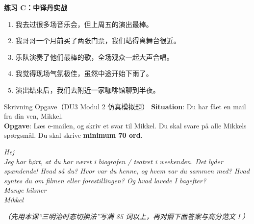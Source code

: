 \textbf{练习 C：中译丹实战}
\begin{enumerate}
  \item 我去过很多场音乐会，但上周五的演出最棒。
  \item 我哥哥一个月前买了两张门票，我们站得离舞台很近。
  \item 乐队演奏了他们最棒的歌，全场观众一起大声合唱。
  \item 我觉得现场气氛极佳，虽然中途开始下雨了。
  \item 演出结束后，我们去附近一家咖啡馆聊到半夜。
\end{enumerate}


\begin{emailbox}{Skrivning Opgave（DU3 Modul 2 仿真模拟题）}
\textbf{Situation}: Du har fået en mail fra din ven, Mikkel.\\
\textbf{Opgave}: Læs e-mailen, og skriv et svar til Mikkel. Du skal svare på alle Mikkels spørgsmål. Du skal skrive \textbf{minimum 70 ord}.

\vspace{0.3em}
\textit{Hej\\
Jeg har hørt, at du har været i biografen / teatret i weekenden. Det lyder spændende! Hvad så du? Hvor var du henne, og hvem var du sammen med? Hvad syntes du om filmen eller forestillingen? Og hvad lavede I bagefter?\\
Mange hilsner\\
Mikkel}
\end{emailbox}

\textit{（先用本课“三明治时态切换法”写满 85 词以上，再对照下面答案与高分范文！）}

